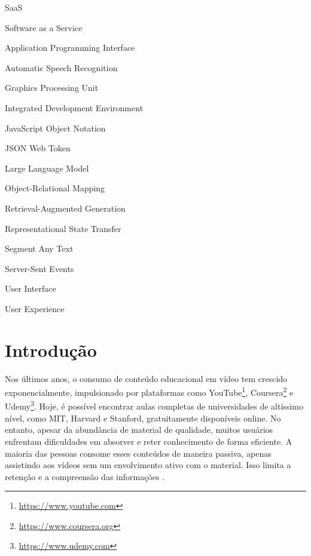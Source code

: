 \documentclass[tcc,capa]{texufpel}
\begin{document}
\listoffigures

\listoftables

\begin{listofabbrv}{SaaS}%
        \item[SaaS] Software as a Service
        \item[API] Application Programming Interface
        \item[ASR] Automatic Speech Recognition
        \item[GPU] Graphics Processing Unit
        \item[IDE] Integrated Development Environment
        \item[JSON] JavaScript Object Notation
        \item[JWT] JSON Web Token
        \item[LLM] Large Language Model
        \item[ORM] Object-Relational Mapping
        \item[RAG] Retrieval-Augmented Generation
        \item[REST] Representational State Transfer
        \item[SaT] Segment Any Text
        \item[SSE] Server-Sent Events
        \item[UI] User Interface
        \item[UX] User Experience
\end{listofabbrv}

\tableofcontents

\chapter{Introdução}
Nos últimos anos, o consumo de conteúdo educacional em vídeo tem crescido exponencialmente, impulsionado por plataformas como YouTube\footnote{\url{https://www.youtube.com}}, Coursera\footnote{\url{https://www.coursera.org}} e Udemy\footnote{\url{https://www.udemy.com}}. Hoje, é possível encontrar aulas completas de universidades de altíssimo nível, como MIT, Harvard e Stanford, gratuitamente disponíveis online. No entanto, apesar da abundância de material de qualidade, muitos usuários enfrentam dificuldades em absorver e reter conhecimento de forma eficiente. A maioria das pessoas consome esses conteúdos de maneira passiva, apenas assistindo aos vídeos sem um envolvimento ativo com o material. Isso limita a retenção e a compreensão das informações \cite{guo2014video}.
\end{document}

